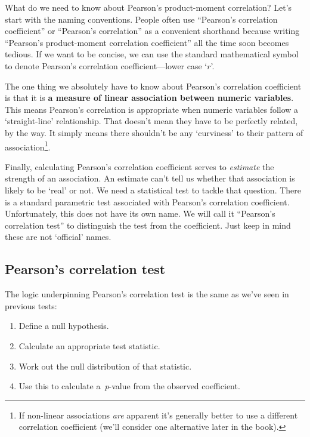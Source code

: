 \documentclass[
]{book}
\providecommand{\tightlist}{%
  \setlength{\itemsep}{0pt}\setlength{\parskip}{0pt}}
\begin{document}
What do we need to know about Pearson's product-moment correlation? Let's start with the naming conventions. People often use ``Pearson's correlation coefficient'' or ``Pearson's correlation'' as a convenient shorthand because writing ``Pearson's product-moment correlation coefficient'' all the time soon becomes tedious. If we want to be concise, we can use the standard mathematical symbol to denote Pearson's correlation coefficient---lower case `\(r\)'.

The one thing we absolutely have to know about Pearson's correlation coefficient is that it is \textbf{a measure of linear association between numeric variables}. This means Pearson's correlation is appropriate when numeric variables follow a `straight-line' relationship. That doesn't mean they have to be perfectly related, by the way. It simply means there shouldn't be any `curviness' to their pattern of association\footnote{If non-linear associations \emph{are} apparent it's generally better to use a different correlation coefficient (we'll consider one alternative later in the book).}.

Finally, calculating Pearson's correlation coefficient serves to \emph{estimate} the strength of an association. An estimate can't tell us whether that association is likely to be `real' or not. We need a statistical test to tackle that question. There is a standard parametric test associated with Pearson's correlation coefficient. Unfortunately, this does not have its own name. We will call it ``Pearson's correlation test'' to distinguish the test from the coefficient. Just keep in mind these are not `official' names.

\hypertarget{pearsons-correlation-test}{%
\subsection{Pearson's correlation test}\label{pearsons-correlation-test}}

The logic underpinning Pearson's correlation test is the same as we've seen in previous tests:

\begin{enumerate}
\def\labelenumi{\arabic{enumi}.}
\tightlist
\item
  Define a null hypothesis.
\item
  Calculate an appropriate test statistic.
\item
  Work out the null distribution of that statistic.
\item
  Use this to calculate a~\emph{p}-value from the observed coefficient.
\end{enumerate}
\end{document}
